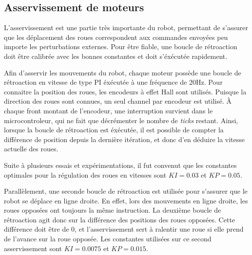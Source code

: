 \subsection{Asservissement de moteurs}

L'asservissement est une partie très importante du robot, permettant de s'assurer que les déplacement des roues correspondent aux commandes envoyées peu importe les perturbations externes. Pour être fiable, une boucle de rétroaction doit être calibrée avec les bonnes constantes et doit s'éxécutée rapidement.

Afin d'asservir les mouvements du robot, chaque moteur possède une boucle de rétroaction en vitesse de type PI éxécutée à une fréquence de 20Hz. Pour connaitre la position des roues, les encodeurs à effet Hall sont utilisés. Puisque la direction des roues sont connues, un seul channel par encodeur est utilisé. À chaque front montant de l'encodeur, une interruption survient dans le microcontroleur, qui ne fait que décrémenter le nombre de \textit{ticks} restant. Ainsi, lorsque la boucle de rétroaction est éxécutée, il est possible de compter la différence de position depuis la dernière itération, et donc d'en déduire la vitesse actuelle des roues. 

Suite à plusieurs essais et expérimentations, il fut convenut que les constantes optimales pour la régulation des roues en vitesses sont $KI = 0.03$ et $KP = 0.05$. 

Parallèlement, une seconde boucle de rétroaction est utilisée pour s'assurer que le robot se déplace en ligne droite. En effet, lors des mouvements en ligne droite, les roues opposées ont toujours la même instruction. La deuxième boucle de rétroaction agit donc sur la différence des positions des roues opposées. Cette différence doit être de 0, et l'asservissement sert à ralentir une roue si elle prend de l'avance sur la roue opposée. Les constantes utilisées sur ce second asservissement sont $KI = 0.0075$ et $KP = 0.015$.
